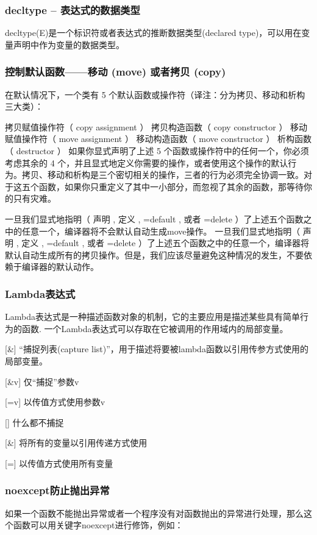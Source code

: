 \subsubsection{decltype – 表达式的数据类型}

decltype(E)是一个标识符或者表达式的推断数据类型(declared type)，可以用在变量声明中作为变量的数据类型。

\subsubsection{控制默认函数——移动 (move) 或者拷贝 (copy)}
在默认情况下，一个类有 5 个默认函数或操作符（译注：分为拷贝、移动和析构三大类）：

拷贝赋值操作符（ copy assignment ）
拷贝构造函数（ copy constructor ）
移动赋值操作符（ move assignment ）
移动构造函数（ move constructor ）
析构函数（ destructor ）
如果你显式声明了上述 5 个函数或操作符中的任何一个，你必须考虑其余的 4 个，并且显式地定义你需要的操作，或者使用这个操作的默认行为。拷贝、移动和析构是三个密切相关的操作，三者的行为必须完全协调一致。对于这五个函数，如果你只重定义了其中一小部分，而忽视了其余的函数，那等待你的只有灾难。

一旦我们显式地指明（ 声明 , 定义 , =default , 或者 =delete ）了上述五个函数之中的任意一个，编译器将不会默认自动生成move操作。
一旦我们显式地指明（ 声明 , 定义 , =default , 或者 =delete ）了上述五个函数之中的任意一个，编译器将默认自动生成所有的拷贝操作。但是，我们应该尽量避免这种情况的发生，不要依赖于编译器的默认动作。

\subsubsection{Lambda表达式}
Lambda表达式是一种描述函数对象的机制，它的主要应用是描述某些具有简单行为的函数.
一个Lambda表达式可以存取在它被调用的作用域内的局部变量。

[\&] “捕捉列表(capture list)”，用于描述将要被lambda函数以引用传参方式使用的局部变量。

[\&v] 仅“捕捉”参数v

[=v] 以传值方式使用参数v

[] 什么都不捕捉

[\&] 将所有的变量以引用传递方式使用

[=] 以传值方式使用所有变量

\subsubsection{noexcept防止抛出异常}
如果一个函数不能抛出异常或者一个程序没有对函数抛出的异常进行处理，那么这个函数可以用关键字noexcept进行修饰，例如：

